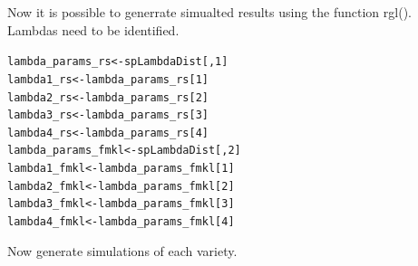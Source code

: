 \documentclass[12pt, a4paper, oneside]{article}\usepackage[]{graphicx}\usepackage[]{color}
\makeatletter
\newcommand{\hlnum}[1]{\textcolor[rgb]{0.686,0.059,0.569}{#1}}%
\newcommand{\hlstd}[1]{\textcolor[rgb]{0.345,0.345,0.345}{#1}}%
\newcommand{\hlkwb}[1]{\textcolor[rgb]{0.69,0.353,0.396}{#1}}%
\newenvironment{kframe}{%
 \def\at@end@of@kframe{}%
 \ifinner\ifhmode%
  \def\at@end@of@kframe{\end{minipage}}%
  \begin{minipage}{\columnwidth}%
 \fi\fi%
 \def\FrameCommand##1{\hskip\@totalleftmargin \hskip-\fboxsep
 \colorbox{shadecolor}{##1}\hskip-\fboxsep
     \hskip-\linewidth \hskip-\@totalleftmargin \hskip\columnwidth}%
 \MakeFramed {\advance\hsize-\width
   \@totalleftmargin\z@ \linewidth\hsize
   \@setminipage}}%
 {\par\unskip\endMakeFramed%
 \at@end@of@kframe}
\newenvironment{knitrout}{}{} %
\makeatother
\begin{document}
Now it is possible to generrate simualted results using the function rgl(). Lambdas need to be identified. 
\begin{knitrout}
\color{fgcolor}\begin{kframe}
\begin{alltt}
\hlstd{lambda_params_rs} \hlkwb{<-} \hlstd{spLambdaDist[,} \hlnum{1}\hlstd{]}
\hlstd{lambda1_rs} \hlkwb{<-} \hlstd{lambda_params_rs[}\hlnum{1}\hlstd{]}
\hlstd{lambda2_rs} \hlkwb{<-} \hlstd{lambda_params_rs[}\hlnum{2}\hlstd{]}
\hlstd{lambda3_rs} \hlkwb{<-} \hlstd{lambda_params_rs[}\hlnum{3}\hlstd{]}
\hlstd{lambda4_rs} \hlkwb{<-} \hlstd{lambda_params_rs[}\hlnum{4}\hlstd{]}
\hlstd{lambda_params_fmkl} \hlkwb{<-} \hlstd{spLambdaDist[,} \hlnum{2}\hlstd{]}
\hlstd{lambda1_fmkl} \hlkwb{<-} \hlstd{lambda_params_fmkl[}\hlnum{1}\hlstd{]}
\hlstd{lambda2_fmkl} \hlkwb{<-} \hlstd{lambda_params_fmkl[}\hlnum{2}\hlstd{]}
\hlstd{lambda3_fmkl} \hlkwb{<-} \hlstd{lambda_params_fmkl[}\hlnum{3}\hlstd{]}
\hlstd{lambda4_fmkl} \hlkwb{<-} \hlstd{lambda_params_fmkl[}\hlnum{4}\hlstd{]}
\end{alltt}
\end{kframe}
\end{knitrout}

Now generate simulations of each variety. 
\end{document}
